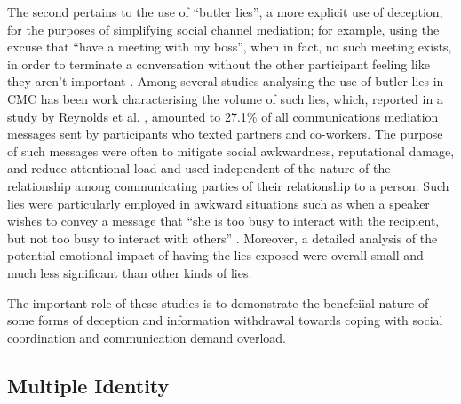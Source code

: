 \documentclass{IOS-Book-Article}     %
\newcommand{\tbox}[3][red]{{
\color{#1}\noindent{
   \fbox{\scriptsize{ {\bf #2} \textsl{#3}}}
   \vspace{2pt}
}
}}
\newcommand{\todo}[1]{\tbox{TODO:}{#1}}
\begin{document}
The second pertains to the use of ``butler lies'', a more explicit use of deception, for the purposes of simplifying social channel mediation; for example, using the excuse that ``have a meeting with my boss'', when in fact, no such meeting exists, in order to terminate a conversation without the other participant feeling like they aren't important \cite{Hancock:2009:BLA:1518701.1518782}.  Among several studies analysing the use of butler lies in CMC has been work characterising the volume of such lies, which, reported in a study by Reynolds et al. \cite{Reynolds:2013:BLB:2441776.2441862}, amounted to 27.1\% of all communications mediation messages sent by participants who texted partners and co-workers. The purpose of such messages were often to mitigate social awkwardness, reputational damage, and reduce attentional load and used independent of the nature of the relationship among communicating parties of their relationship to a person.  Such lies were particularly employed in awkward situations such as when a speaker wishes to convey a message that ``she is too busy to interact with the recipient, but not too busy to interact with others'' \cite{Reynolds:2013:BLB:2441776.2441862}.  Moreover, a detailed analysis of the potential emotional impact of having the lies exposed were overall small and much less significant than other kinds of lies.

The important role of these studies is to demonstrate the benefciial nature of some forms of deception and information withdrawal towards  coping with social coordination and communication demand overload.






\subsection{Multiple Identity}
\end{document}
